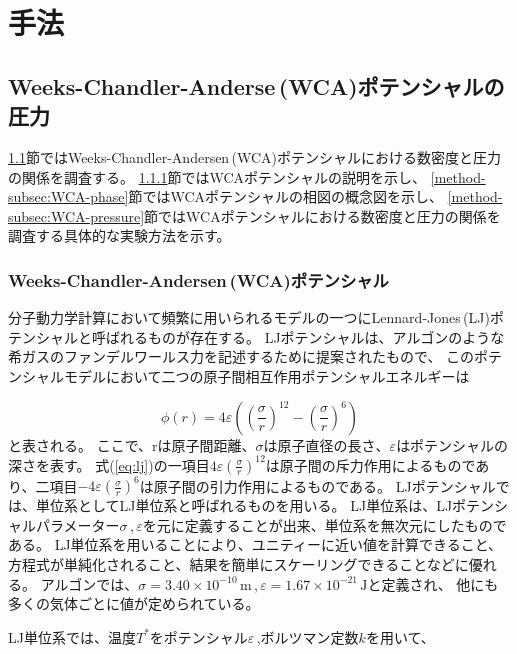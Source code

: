 \documentclass[titlepage]{jsreport}
\begin{document}
\chapter{手法} \label{chap:method}
\section{Weeks-Chandler-Anderse\,(WCA)ポテンシャルの圧力}\label{method-sec:WCA-press}
\ref{method-sec:WCA-press}節ではWeeks-Chandler-Andersen\,(WCA)ポテンシャルにおける数密度と圧力の関係を調査する。
\ref{method-subsec:WCA}節ではWCAポテンシャルの説明を示し、
\ref{method-subsec:WCA-phase}節ではWCAポテンシャルの相図の概念図を示し、
\ref{method-subsec:WCA-pressure}節ではWCAポテンシャルにおける数密度と圧力の関係を調査する具体的な実験方法を示す。

\subsection{Weeks-Chandler-Andersen\,(WCA)ポテンシャル}\label{method-subsec:WCA}
分子動力学計算において頻繁に用いられるモデルの一つにLennard-Jones\,(LJ)ポテンシャルと呼ばれるものが存在する。
LJポテンシャルは、アルゴンのような希ガスのファンデルワールス力を記述するために提案\cite{Lennard_Jones_1931}されたもので、
このポテンシャルモデルにおいて二つの原子間相互作用ポテンシャルエネルギーは

\large
\begin{equation}
\phi(r)=4{\varepsilon}\left(\left(\frac{\sigma}{r}\right)^{12}-\left(\frac{\sigma}{r}\right)^6\right)\label{eq:lj}
\end{equation}
\normalsize
と表される。
ここで、rは原子間距離、${\sigma}$は原子直径の長さ、${\varepsilon}$はポテンシャルの深さを表す。
式(\ref{eq:lj})の一項目$4{\varepsilon}(\frac{\sigma}{r})^{12}$は原子間の斥力作用によるものであり、二項目$-4\varepsilon(\frac{\sigma}{r})^{6}$は原子間の引力作用によるものである。
LJポテンシャルでは、単位系としてLJ単位系と呼ばれるものを用いる。
LJ単位系は、LJポテンシャルパラメーター${\sigma}$\,,\,${\varepsilon}$を元に定義することが出来、単位系を無次元にしたものである。
LJ単位系を用いることにより、ユニティーに近い値を計算できること、方程式が単純化されること、結果を簡単にスケーリングできることなどに優れる。
アルゴンでは、${\sigma}=3.40×10^{-10}\,\mathrm{m}$\,,\,${\varepsilon}=1.67×10^{-21}\,\mathrm{J}$と定義\cite{argon-parameters}され、
他にも多くの気体ごとに値が定められている\cite{graphane-parameters}\cite{many-parameters}。

LJ単位系では、温度$T^*$をポテンシャル$\varepsilon$\,,ボルツマン定数$k$を用いて、
\end{document}
